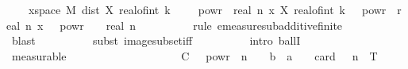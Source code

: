 \begin{isabellebody}
\ \ \ \ {\isacharbraceleft}{\kern0pt}x{\isasymin}space\ {\isacharquery}{\kern0pt}M{\isachardot}{\kern0pt}\ dist\ {\isacharparenleft}{\kern0pt}X\ {\isacharparenleft}{\kern0pt}real{\isacharunderscore}{\kern0pt}of{\isacharunderscore}{\kern0pt}int\ {\isacharparenleft}{\kern0pt}k\ {\isacharminus}{\kern0pt}\ {}{\isacharparenright}{\kern0pt}\ {\isacharasterisk}{\kern0pt}\ {}\ powr\ {\isacharminus}{\kern0pt}\ real\ n{\isacharparenright}{\kern0pt}\ x{\isacharparenright}{\kern0pt}\ {\isacharparenleft}{\kern0pt}X\ {\isacharparenleft}{\kern0pt}real{\isacharunderscore}{\kern0pt}of{\isacharunderscore}{\kern0pt}int\ k\ {\isacharasterisk}{\kern0pt}\ {}\ powr\ {\isacharminus}{\kern0pt}\ real\ n{\isacharparenright}{\kern0pt}\ x{\isacharparenright}{\kern0pt}\ {\isasymge}\ {}\ powr\ {\isacharparenleft}{\kern0pt}{\isacharminus}{\kern0pt}\ {\isasymgamma}\ {\isacharasterisk}{\kern0pt}\ real\ n{\isacharparenright}{\kern0pt}{\isacharbraceright}{\kern0pt}{\isacharparenright}{\kern0pt}{\isachardoublequoteclose}\isanewline
\ \ \ \ \ \ \ \ \isamarkupfalse%
\ {\isacharparenleft}{\kern0pt}rule\ emeasure{\isacharunderscore}{\kern0pt}subadditive{\isacharunderscore}{\kern0pt}finite{\isacharparenright}{\kern0pt}\isanewline
\ \ \ \ \ \ \ \ \ \isamarkupfalse%
\ blast\isanewline
\ \ \ \ \ \ \ \ \isamarkupfalse%
\ {\isacharparenleft}{\kern0pt}subst\ image{\isacharunderscore}{\kern0pt}subset{\isacharunderscore}{\kern0pt}iff{\isacharparenright}{\kern0pt}\isanewline
\ \ \ \ \ \ \ \ \isamarkupfalse%
\ {\isacharparenleft}{\kern0pt}intro\ ballI{\isacharparenright}{\kern0pt}\isanewline
\ \ \ \ \ \ \ \ \isamarkupfalse%
\ measurable\isanewline
\ \ \ \ \ \ \ \ \isamarkupfalse%
\isanewline
\ \ \ \ \ \ \isamarkupfalse%
\ \isamarkupfalse%
\ {\isachardoublequoteopen}{\isachardot}{\kern0pt}{\isachardot}{\kern0pt}{\isachardot}{\kern0pt}\ {\isasymle}\ C\ {\isacharasterisk}{\kern0pt}\ {}\ powr\ {\isacharparenleft}{\kern0pt}{\isacharminus}{\kern0pt}\ n\ {\isacharasterisk}{\kern0pt}\ {\isacharparenleft}{\kern0pt}{}\ {\isacharplus}{\kern0pt}\ b\ {\isacharminus}{\kern0pt}\ a\ {\isacharasterisk}{\kern0pt}\ {\isasymgamma}{\isacharparenright}{\kern0pt}{\isacharparenright}{\kern0pt}\ {\isacharasterisk}{\kern0pt}\ {\isacharparenleft}{\kern0pt}card\ {\isacharbraceleft}{\kern0pt}{}{\isachardot}{\kern0pt}{\isachardot}{\kern0pt}{\isasymlfloor}{}\ {\isacharcircum}{\kern0pt}\ n\ {\isacharasterisk}{\kern0pt}\ T{\isasymrfloor}{\isacharbraceright}{\kern0pt}{\isacharparenright}{\kern0pt}{\isachardoublequoteclose}\isanewline

\end{isabellebody}
